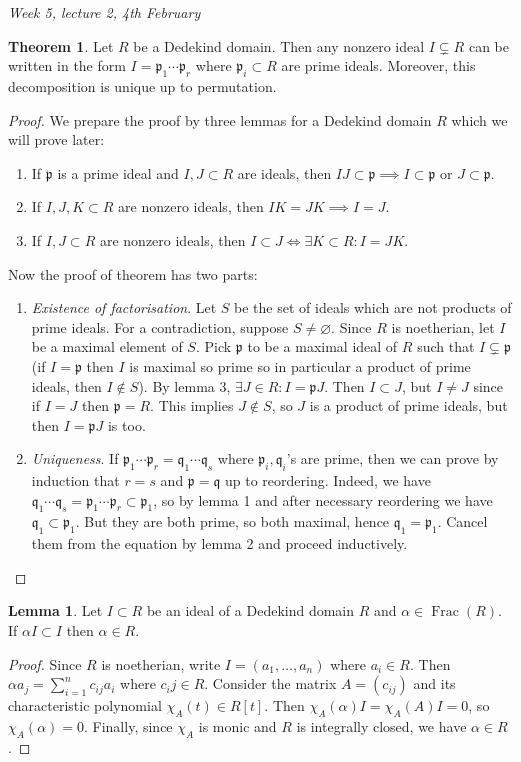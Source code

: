 \documentclass{article}
\newcommand{\Frac}{\operatorname{Frac}}
\newcommand{\ip}{\mathfrak{p}}
\newcommand{\iq}{\mathfrak{q}}
\theoremstyle{definition}
\newtheorem{thm}[defn]{Theorem}
\newtheorem{lemma}[defn]{Lemma}
\begin{document}
\begin{flushright}
\textit{Week 5, lecture 2, 4th February}
\end{flushright}

\begin{thm}
\label{thm:uniquefactinDD}
Let $R$ be a Dedekind domain. Then any nonzero ideal $I\subsetneq R$ can be written in the form $I=\ip_1\cdots\ip_r$ where $\ip_i\subset R$ are prime ideals. Moreover, this decomposition is unique up to permutation.
\end{thm}
\begin{proof}
We prepare the proof by three lemmas for a Dedekind domain $R$ which we will prove later:
\begin{enumerate}
\item If $\ip$ is a prime ideal and $I,J\subset R$ are ideals, then $IJ\subset\ip\implies I\subset\ip$ or $J\subset\ip$.
\item If $I,J,K\subset R$ are nonzero ideals, then $IK=JK\implies I=J$.
\item If $I,J\subset R$ are nonzero ideals, then $I\subset J\iff\exists K\subset R:I=JK$.
\end{enumerate}
Now the proof of theorem has two parts:
\begin{enumerate}
\item \textit{Existence of factorisation}. Let $S$ be the set of ideals which are not products of prime ideals. For a contradiction, suppose $S\neq\varnothing$. Since $R$ is noetherian, let $I$ be a maximal element of $S$. Pick $\ip$ to be a maximal ideal of $R$ such that $I\subsetneq\ip$ (if $I=\ip$ then $I$ is maximal so prime so in particular a product of prime ideals, then $I\notin S$). By lemma 3, $\exists J\in R:I=\ip J$. Then $I\subset J$, but $I\neq J$ since if $I=J$ then $\ip=R$. This implies $J\notin S$, so $J$ is a product of prime ideals, but then $I=\ip J$ is too.
\item \textit{Uniqueness}. If $\ip_1\cdots\ip_r=\iq_1\cdots\iq_s$ where $\ip_i,\iq_i$'s are prime, then we can prove by induction that $r=s$ and $\ip=\iq$ up to reordering. Indeed, we have $\iq_1\cdots\iq_s=\ip_1\cdots\ip_r\subset\ip_1$, so by lemma 1 and after necessary reordering we have $\iq_1\subset\ip_1$. But they are both prime, so both maximal, hence $\iq_1=\ip_1$. Cancel them from the equation by lemma 2 and proceed inductively.
\end{enumerate}
\end{proof}

\begin{lemma}
\label{lemma:aIinIimpliesainR}
Let $I\subset R$ be an ideal of a Dedekind domain $R$ and $\alpha\in\Frac(R)$. If $\alpha I\subset I$ then $\alpha\in R$.
\end{lemma}
\begin{proof}
Since $R$ is noetherian, write $I=(a_1,\ldots,a_n)$ where $a_i\in R$. Then $\alpha a_j=\sum_{i=1}^n c_{ij} a_i$ where $c_ij\in R$. Consider the matrix $A=(c_{ij})$ and its characteristic polynomial $\chi_A(t)\in R[t]$. Then $\chi_A(\alpha)I=\chi_A(A)I=0$, so $\chi_A(\alpha)=0$. Finally, since $\chi_A$ is monic and $R$ is integrally closed, we have $\alpha\in R$.
\end{proof}
\end{document}

